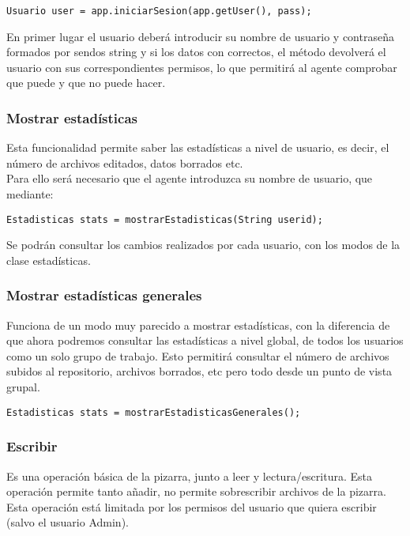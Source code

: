 \begin{center}
\texttt{Usuario user = app.iniciarSesion(app.getUser(), pass);}
\end{center}

En primer lugar el usuario deberá introducir su nombre de usuario y contraseña formados por sendos string y si los datos con correctos, el método devolverá el usuario con sus correspondientes permisos, lo que permitirá al agente comprobar que puede y que no puede hacer.

\subsubsection{Mostrar estadísticas}\label{sec:est}
Esta funcionalidad permite saber las estadísticas a nivel de usuario, es decir, el número de archivos editados, datos borrados etc.\\
Para ello será necesario que el agente introduzca su nombre de usuario, que mediante:

\begin{center}
\texttt{Estadisticas stats = mostrarEstadisticas(String userid);}
\end{center}

Se podrán consultar los cambios realizados por cada usuario, con los modos de la clase estadísticas.

\subsubsection{Mostrar estadísticas generales}
Funciona de un modo muy parecido a mostrar estadísticas, con la diferencia de que ahora podremos consultar las estadísticas a nivel global, de todos los usuarios como un solo grupo de trabajo. Esto permitirá consultar el número de archivos subidos al repositorio, archivos borrados, etc pero todo desde un punto de vista grupal.

\begin{center}
\texttt{Estadisticas stats = mostrarEstadisticasGenerales();}
\end{center}

\subsubsection{Escribir}
Es una operación básica de la pizarra, junto a leer y lectura/escritura. Esta operación permite tanto añadir, no permite sobrescribir archivos de la pizarra. Esta operación está limitada por los permisos del usuario que quiera escribir (salvo el usuario Admin).\\

